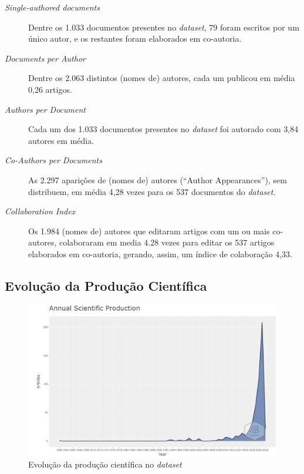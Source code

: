 \begin{description}
    \item [\textit{Single-authored documents}] Dentre os 1.033 documentos presentes no \textit{dataset}, 79 foram escritos por um único autor, e os restantes foram elaborados em co-autoria.
    \item [\textit{Documents per Author}] Dentre os 2.063 distintos (nomes de) autores, cada um publicou em média 0,26 artigos.
    \item [\textit{Authors per Document}] Cada um dos 1.033 documentos presentes no \textit{dataset} foi autorado com 3,84 autores em média.
    \item [\textit{Co-Authors per Documents}] As 2.297 aparições de (nomes de) autores (``Author Appearances''), sem distribuem, em média 4,28 vezes para os 537 documentos do \textit{dataset}.
    \item [\textit{Collaboration Index}] Os 1.984 (nomes de) autores que editaram artigos com um ou mais co-autores, colaboraram em media 4.28 vezes para editar os 537 artigos elaborados em co-autoria, gerando, assim, um índice de colaboração 4,33. 
\end{description}

\subsection{Evolução da Produção Científica}

\begin{figure}
    \centering
    \includegraphics[width=1\textwidth]{experiments/titofrota/PesquisaBibliometrica/Deepfakes/annual-plot.png}
    \caption{Evolução da produção científica no \textit{dataset}}
    \label{fig:evol:anual:DEEPFAKES@titofrota}
\end{figure}

